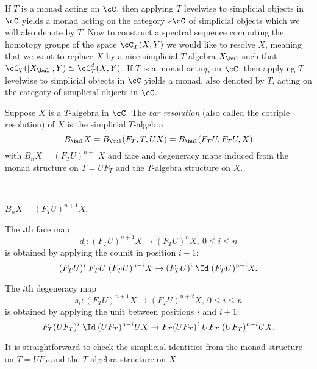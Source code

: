 \documentclass[leqno,oneside,english]{elsarticle}
\newcounter{enumisaved}
\newlength{\thmsaved}
\newlength{\thmnow}
\begin{document}
If $T$ is a monad acting on $\cC$, then applying $T$ levelwise to simplicial
objects in $\cC$ yields a monad acting on the category $s\cC$ of simplicial objects
which we will also denote by $T$. Now to construct a spectral sequence
computing the homotopy groups of the space $\cC_T(X,Y)$ we would like to
resolve $X$, meaning that we want to replace $X$ by a nice simplicial
$T$-algebra $X_{\bul}$ such that $\cC_T(|X_{\bul}|,Y) \simeq \cC_T^d(X,Y)$.
If $T$ is a monad acting on $\cC$, then applying $T$ levelwise to
simplicial objects in $\cC$ yields a monad, also denoted by $T$,
acting on the category of simplicial objects in $\cC$. 

\begin{defn}\label{def:bar-resolution}
  Suppose $X$ is a $T$-algebra in $\cC$.  The \emph{bar resolution}
  (also called the cotriple resolution) of $X$ is the simplicial $T$-algebra
  \[
  B_{\bul}X=B_{\bul}(F_T,T,UX)=B_{\bul}(F_TU, F_TU, X)
  \] 
  with $B_nX=(F_TU)^{n+1}X$ and face and degeneracy maps induced from the
  monad structure on $T=UF_T$ and the $T$-algebra structure on $X$.
  {{    {}  \ifshowcomplete
  \ 
  {
  \begin{hypothenumerate}
  \item $B_nX=(F_TU)^{n+1}X$.
  \item The $i$th face map
    \[ 
    d_i\colon (F_TU)^{n+1}X\rightarrow (F_T U)^{n}X,\ 0\leq i \leq n
    \] 
    is obtained by applying the counit in position $i+1$:
    \[
    (F_TU)^i \; F_TU \; (F_TU)^{n-i} X \to 
    (F_TU)^i \; \Id \; (F_TU)^{n-i} X.
    \]
  \item The $i$th degeneracy map
    \[ 
    s_i\colon (F_TU)^{n+1}X\rightarrow (F_T U)^{n+2}X,\ 0\leq i\leq n
    \] 
    is obtained by applying the unit between positions $i$ and $i+1$:
    \[ 
    F_T(UF_T)^{i} \; \Id \: (UF_T)^{n-i}UX\rightarrow
    F_T(UF_T)^{i} \; UF_T \; (UF_T)^{n-i}UX.
    \]
  \end{hypothenumerate}
  
  It is straightforward to check the simplicial identities from the
  monad structure on $T=UF_T$ and the $T$-algebra structure on $X$.
  
}
  {}
  \ 
  \ifthenelse{\lengthtest{\thmnow > \thmsaved}}{
    
    \setcounter{thm}{{\strip@pt{\thmsaved}}}  
  }{
    
  }
  \setcounter{enumi}{\theenumisaved}
    \else  \fi
}}{}
\end{defn}
\end{document}
